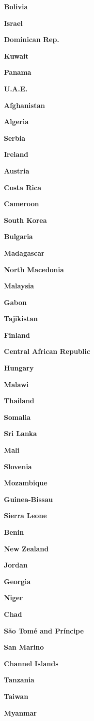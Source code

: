 \textbf{Bolivia}

\textbf{Israel}

\textbf{Dominican Rep.}

\textbf{Kuwait}

\textbf{Panama}

\textbf{U.A.E.}

\textbf{Afghanistan}

\textbf{Algeria}

\textbf{Serbia}

\textbf{Ireland}

\textbf{Austria}

\textbf{Costa Rica}

\textbf{Cameroon}

\textbf{South Korea}

\textbf{Bulgaria}

\textbf{Madagascar}

\textbf{North Macedonia}

\textbf{Malaysia}

\textbf{Gabon}

\textbf{Tajikistan}

\textbf{Finland}

\textbf{Central African Republic}

\textbf{Hungary}

\textbf{Malawi}

\textbf{Thailand}

\textbf{Somalia}

\textbf{Sri Lanka}

\textbf{Mali}

\textbf{Slovenia}

\textbf{Mozambique}

\textbf{Guinea-Bissau}

\textbf{Sierra Leone}

\textbf{Benin}

\textbf{New Zealand}

\textbf{Jordan}

\textbf{Georgia}

\textbf{Niger}

\textbf{Chad}

\textbf{São Tomé and Príncipe}

\textbf{San Marino}

\textbf{Channel Islands}

\textbf{Tanzania}

\textbf{Taiwan}

\textbf{Myanmar}

